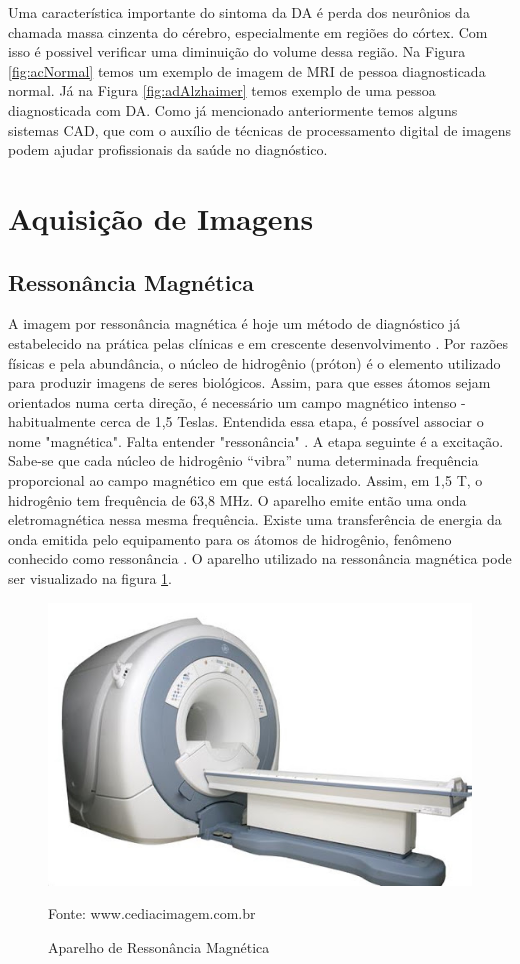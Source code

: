 \documentclass[openright]{UFRGS} %
\begin{document}
Uma característica importante do sintoma da DA é perda dos neurônios da chamada massa cinzenta do cérebro, especialmente em regiões do córtex. Com isso é possivel verificar uma diminuição do volume dessa região. 
Na Figura \ref{fig:acNormal}  temos um exemplo de imagem de MRI de pessoa diagnosticada normal. Já na 
Figura \ref{fig:adAlzhaimer}  temos exemplo de uma pessoa diagnosticada com DA. Como já mencionado anteriormente temos alguns sistemas CAD, que com o auxílio de técnicas de processamento digital de imagens podem ajudar profissionais da saúde no diagnóstico.


\section{Aquisição de Imagens}

\subsection{Ressonância Magnética}
A imagem por ressonância magnética é hoje um método de diagnóstico já estabelecido na prática  pelas clínicas e em crescente desenvolvimento . Por razões físicas e pela abundância, o núcleo de hidrogênio (próton) é o elemento utilizado para produzir imagens de seres biológicos. Assim, para que esses átomos sejam orientados numa certa direção, é necessário um campo magnético intenso - habitualmente cerca de 1,5 Teslas. Entendida essa etapa, é possível associar o nome "magnética". Falta entender "ressonância" \cite{hage2009imagem}. A etapa seguinte é a excitação. Sabe-se que cada núcleo de
hidrogênio “vibra” numa determinada frequência proporcional
ao campo magnético em que está localizado. Assim, em 1,5 T, o hidrogênio tem frequência de 63,8 MHz. O aparelho emite então uma onda eletromagnética nessa mesma frequência. Existe uma transferência de energia da onda emitida pelo equipamento para os átomos de hidrogênio, fenômeno conhecido como ressonância \cite{hage2009imagem}. O aparelho utilizado na  ressonância magnética  pode ser visualizado na figura \ref{fig:ressonaciaAparelho}.

\begin{figure}[h]
    \centering
    \caption{Aparelho de Ressonância Magnética}
    \includegraphics[scale=0.35]{figuras/ressonaciamagnetica.jpg}
    \centerline{Fonte: www.cediacimagem.com.br}
    \label{fig:ressonaciaAparelho}
\end{figure}
\end{document}
